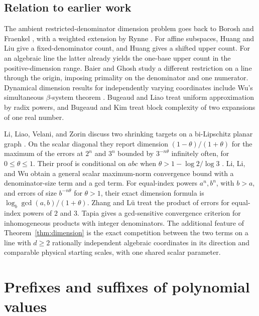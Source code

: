\documentclass[11pt,reqno,a4paper]{amsart}
\theoremstyle{remark}
\begin{document}
\subsection{Relation to earlier work}

The ambient restricted-denominator dimension problem goes back to
Borosh and Fraenkel \cite{met-borosh-fraenkel}, with a weighted
extension by Rynne \cite{met-rynne}. For affine subspaces,
Huang and Liu \cite[Theorem~7]{met-huang-liu} give a fixed-denominator
count, and Huang \cite[Theorems~3.1(b) and~3.2(b)]{met-huang}
gives a shifted upper count. For an algebraic line the latter
already yields the one-base upper count in the positive-dimension
range. Baier and Ghosh \cite{met-baier-ghosh} study a different
restriction on a line through the origin, imposing primality on
the denominator and one numerator. Dynamical dimension results
for independently varying coordinates include Wu's simultaneous
\(\beta\)-system theorem \cite{met-wu}. Bugeaud and Liao
\cite{met-bugeaud-liao} treat uniform approximation by radix powers,
and Bugeaud and Kim \cite{met-bugeaud-kim} treat block complexity
of two expansions of one real number.

Li, Liao, Velani, and Zorin discuss two shrinking targets on a
bi-Lipschitz planar graph \cite[Eq.~(75)]{met-li-liao}. On the
scalar diagonal they report dimension \((1-\theta)/(1+\theta)\)
for the maximum of the errors at \(2^n\) and \(3^n\) bounded by
\(3^{-n\theta}\) infinitely often, for \(0\leq\theta\leq1\).
Their proof is conditional on \(abc\) when
\(\theta>1-\log 2/\log 3\) \cite[Remark~13]{met-li-liao}.
Li, Li, and Wu \cite[Theorem~1.3 and \S4]{met-li-li-wu} obtain a
general scalar maximum-norm convergence bound with a denominator-size
term and a gcd term. For equal-index powers \(a^n,b^n\), with \(b>a\),
and errors of size \(b^{-n\theta}\) for \(\theta>1\), their exact
dimension formula is \(\log_b\gcd(a,b)/(1+\theta)\).
Zhang and L\"u \cite{met-zhang-lu} treat the product of errors
for equal-index powers of \(2\) and \(3\). Tapia
\cite[Theorem~1]{met-tapia} gives a gcd-sensitive convergence
criterion for inhomogeneous products with integer denominators. The additional feature of Theorem~\ref{thm:dimension}
is the exact competition between the two terms on a line with
\(d\geq2\) rationally independent algebraic coordinates in its
direction and comparable physical starting scales, with one shared
scalar parameter.

\section{Prefixes and suffixes of polynomial values}\label{sec:polynomials}
\end{document}
